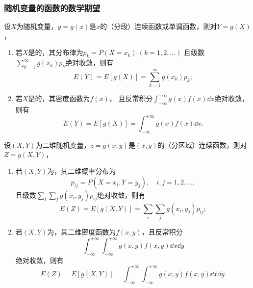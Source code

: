 \subsubsection{随机变量的函数的数学期望}
\begin{theorem}\label{theorem:随机变量的数字特征.一维随机变量的函数的数学期望}
设\(X\)为随机变量，\(y=g(x)\)是\(x\)的（分段）连续函数或单调函数，则对\(Y=g(X)\)，
\begin{enumerate}
\item 若\(X\)是的，其分布律为\(p_k = P(X=x_k)\ (k=1,2,\dotsc)\)
且级数\(\sum_{k=1}^\infty g(x_k) p_k\)绝对收敛，则有\[
E(Y) = E[g(X)] = \sum_{k=1}^\infty {g(x_k) p_k};
\]
\item 若\(X\)是的，其密度函数为\(f(x)\)，
且反常积分\(\int_{-\infty}^{+\infty} g(x) f(x) \dd{x}\)绝对收敛，则有\[
E(Y) = E[g(X)] = \int_{-\infty}^{+\infty} g(x) f(x) \dd{x}.
\]
\end{enumerate}
\end{theorem}

\begin{theorem}\label{theorem:随机变量的数字特征.二维随机变量的函数的数学期望}
设\((X,Y)\)为二维随机变量，\(z=g(x,y)\)是\((x,y)\)的（分区域）连续函数，则对\(Z=g(X,Y)\)，\begin{enumerate}
\item 若\((X,Y)\)为，其二维概率分布为\[
p_{ij} = P(X=x_i,Y=y_j), \quad i,j=1,2,\dotsc,
\]且级数\(\sum_i \sum_j g(x_i,y_j) p_{ij}\)绝对收敛，则有\[
E(Z) = E[g(X,Y)] = \sum_i \sum_j g(x_i,y_j) p_{ij};
\]
\item 若\((X,Y)\)为，其二维密度函数为\(f(x,y)\)，且反常积分\[
\int_{-\infty}^{+\infty} \int_{-\infty}^{+\infty} g(x,y) f(x,y) \dd{x}\dd{y}
\]绝对收敛，则有\[
E(Z) = E[g(X,Y)] = \int_{-\infty}^{+\infty} \int_{-\infty}^{+\infty} g(x,y) f(x,y) \dd{x}\dd{y}.
\]
\end{enumerate}
\end{theorem}

